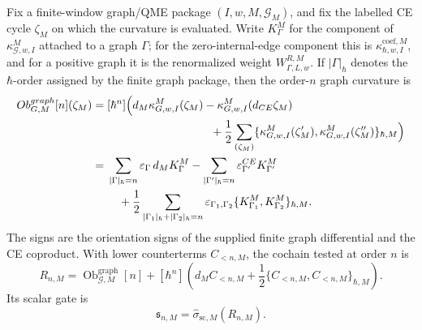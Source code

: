 \begin{thm}\label{thm:actual-finite-window-nonscalar-decision-datum}
  Fix a finite-window graph/QME package
  \((I,w,M,\mathcal G_M)\), and fix the labelled CE cycle
  \(\zeta_M\) on which the curvature is evaluated.  Write
  \(K^M_{\Gamma}\) for the component of
  \(\kappa^M_{\mathcal G,w,I}\) attached to a graph
  \(\Gamma\); for the zero-internal-edge component this is
  \(\kappa^{\mathrm{coef},M}_{\hbar,w,I}\), and for a positive graph it
  is the renormalized weight \(W^{R,M}_{\Gamma,L,w}\).  If
  \(|\Gamma|_\hbar\) denotes the \(\hbar\)-order assigned by the finite
  graph package, then the order-\(n\) graph curvature is
  \[
  \begin{aligned}
    \operatorname{Ob}^{\mathrm{graph}}_{\mathcal G,M}[n](\zeta_M)
      ={}&[\hbar^n]\Bigl(
        d_M\kappa^M_{\mathcal G,w,I}(\zeta_M)
        -\kappa^M_{\mathcal G,w,I}(d_{\mathrm{CE}}\zeta_M)\\
      &\hspace{3.2cm}
        +\frac12
        \sum_{(\zeta_M)}
        \{\kappa^M_{\mathcal G,w,I}(\zeta'_M),
          \kappa^M_{\mathcal G,w,I}(\zeta''_M)\}_{\hbar,M}
      \Bigr)                                                     \\
      ={}&
      \sum_{|\Gamma|_\hbar=n}
        \varepsilon_\Gamma\,d_M K^M_\Gamma
      -\sum_{|\Gamma'|_\hbar=n}
        \varepsilon^{\mathrm{CE}}_{\Gamma'}K^M_{\Gamma'}          \\
      &\quad
      +\frac12
      \sum_{|\Gamma_1|_\hbar+|\Gamma_2|_\hbar=n}
        \varepsilon_{\Gamma_1,\Gamma_2}
        \{K^M_{\Gamma_1},K^M_{\Gamma_2}\}_{\hbar,M}.
  \end{aligned}
  \]
  The signs are the orientation signs of the supplied finite graph
  differential and the CE coproduct.  With lower counterterms
  \(C_{<n,M}\), the cochain tested at order \(n\) is
  \[
    R_{n,M}
      =
    \operatorname{Ob}^{\mathrm{graph}}_{\mathcal G,M}[n]
      +[\hbar^n]\left(
        d_M C_{<n,M}
        +\frac12\{C_{<n,M},C_{<n,M}\}_{\hbar,M}\right).
  \]
  Its scalar gate is
  \[
    \mathfrak s_{n,M}=\widehat\sigma_{\mathrm{sc},M}(R_{n,M}).
  \]


\end{thm}

